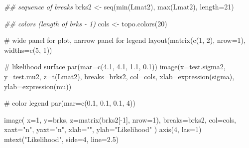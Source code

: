 \documentclass[
  13,
  letterpaper,
]{report}
\newenvironment{Shaded}{\begin{snugshade}}{\end{snugshade}}
\newcommand{\AttributeTok}[1]{\textcolor[rgb]{0.40,0.45,0.13}{#1}}
\newcommand{\CommentTok}[1]{\textcolor[rgb]{0.37,0.37,0.37}{#1}}
\newcommand{\DecValTok}[1]{\textcolor[rgb]{0.68,0.00,0.00}{#1}}
\newcommand{\DocumentationTok}[1]{\textcolor[rgb]{0.37,0.37,0.37}{\textit{#1}}}
\newcommand{\FloatTok}[1]{\textcolor[rgb]{0.68,0.00,0.00}{#1}}
\newcommand{\FunctionTok}[1]{\textcolor[rgb]{0.28,0.35,0.67}{#1}}
\newcommand{\NormalTok}[1]{\textcolor[rgb]{0.00,0.23,0.31}{#1}}
\newcommand{\OtherTok}[1]{\textcolor[rgb]{0.00,0.23,0.31}{#1}}
\newcommand{\SpecialCharTok}[1]{\textcolor[rgb]{0.37,0.37,0.37}{#1}}
\newcommand{\StringTok}[1]{\textcolor[rgb]{0.13,0.47,0.30}{#1}}
\begin{document}
\begin{Shaded}
\begin{Highlighting}[]
\DocumentationTok{\#\# sequence of breaks}
\NormalTok{brks2 }\OtherTok{\textless{}{-}} \FunctionTok{seq}\NormalTok{(}\FunctionTok{min}\NormalTok{(Lmat2), }\FunctionTok{max}\NormalTok{(Lmat2), }\AttributeTok{length=}\DecValTok{21}\NormalTok{)}

\DocumentationTok{\#\# colors (length of brks {-} 1)}
\NormalTok{cols }\OtherTok{\textless{}{-}} \FunctionTok{topo.colors}\NormalTok{(}\DecValTok{20}\NormalTok{)}

\CommentTok{\# wide panel for plot, narrow panel for legend}
\FunctionTok{layout}\NormalTok{(}\FunctionTok{matrix}\NormalTok{(}\FunctionTok{c}\NormalTok{(}\DecValTok{1}\NormalTok{, }\DecValTok{2}\NormalTok{), }\AttributeTok{nrow=}\DecValTok{1}\NormalTok{), }\AttributeTok{widths=}\FunctionTok{c}\NormalTok{(}\DecValTok{5}\NormalTok{, }\DecValTok{1}\NormalTok{))}

\CommentTok{\# likelihood surface}
\FunctionTok{par}\NormalTok{(}\AttributeTok{mar=}\FunctionTok{c}\NormalTok{(}\FloatTok{4.1}\NormalTok{, }\FloatTok{4.1}\NormalTok{, }\FloatTok{1.1}\NormalTok{, }\FloatTok{0.1}\NormalTok{))}
\FunctionTok{image}\NormalTok{(}\AttributeTok{x=}\NormalTok{test.sigma2, }\AttributeTok{y=}\NormalTok{test.mu2, }\AttributeTok{z=}\FunctionTok{t}\NormalTok{(Lmat2),}
      \AttributeTok{breaks=}\NormalTok{brks2, }\AttributeTok{col=}\NormalTok{cols,}
      \AttributeTok{xlab=}\FunctionTok{expression}\NormalTok{(sigma),}
      \AttributeTok{ylab=}\FunctionTok{expression}\NormalTok{(mu))}

\CommentTok{\# color legend}
\FunctionTok{par}\NormalTok{(}\AttributeTok{mar=}\FunctionTok{c}\NormalTok{(}\FloatTok{0.1}\NormalTok{, }\FloatTok{0.1}\NormalTok{, }\FloatTok{0.1}\NormalTok{, }\DecValTok{4}\NormalTok{))}

\FunctionTok{image}\NormalTok{(}
  \AttributeTok{x=}\DecValTok{1}\NormalTok{,}
  \AttributeTok{y=}\NormalTok{brks,}
  \AttributeTok{z=}\FunctionTok{matrix}\NormalTok{(brks2[}\SpecialCharTok{{-}}\DecValTok{1}\NormalTok{], }\AttributeTok{nrow=}\DecValTok{1}\NormalTok{),}
  \AttributeTok{breaks=}\NormalTok{brks2,}
  \AttributeTok{col=}\NormalTok{cols,}
  \AttributeTok{xaxt=}\StringTok{"n"}\NormalTok{, }\AttributeTok{yaxt=}\StringTok{"n"}\NormalTok{,}
  \AttributeTok{xlab=}\StringTok{""}\NormalTok{,}
  \AttributeTok{ylab=}\StringTok{"Likelihood"}
\NormalTok{)}
\FunctionTok{axis}\NormalTok{(}\DecValTok{4}\NormalTok{, }\AttributeTok{las=}\DecValTok{1}\NormalTok{)}
\FunctionTok{mtext}\NormalTok{(}\StringTok{"Likelihood"}\NormalTok{, }\AttributeTok{side=}\DecValTok{4}\NormalTok{, }\AttributeTok{line=}\FloatTok{2.5}\NormalTok{)}
\end{Highlighting}
\end{Shaded}
\end{document}
